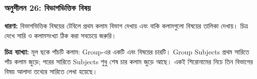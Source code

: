 \par\noindent\subsubsection{অনুশীলন 26: বিভাগভিত্তিক বিষয়}\par\smallskip\textbf{ধারণা:}
বিভাগভিত্তিক বিষয়ের টেবিলে প্রথম কলাম বিভাগ দেখায় এবং বাকি কলামগুলো বিষয়ের তালিকা দেখায়। চিত্র দেখে সারি ও কলামসংখ্যা ঠিক করা সবচেয়ে জরুরি।


\noindent
\textbf{চিত্র ব্যাখ্যা:} 
মূল ছকে পাঁচটি কলাম: Group-এর একটি এবং বিষয়ের চারটি। Group Subjects প্রথম সারিতে পাঁচ কলাম জুড়ে; পরের সারিতে Subjects শুধু শেষ চার কলাম জুড়ে আছে। একই শিরোনামের নিচে তিন বিভাগের বিষয় আলাদা তথ্যের সারিতে লেখা হয়েছে।





